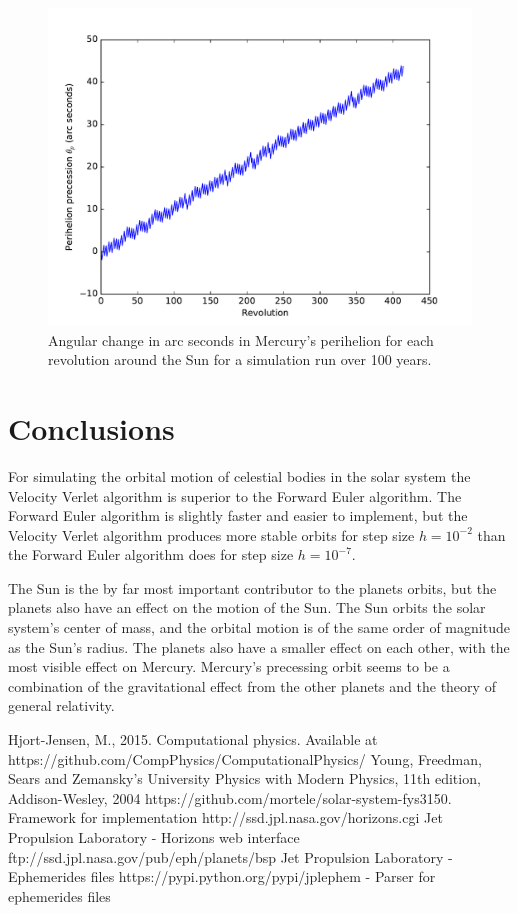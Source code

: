 \documentclass{article}
\begin{document}
\begin{figure}
\centering
\includegraphics[width=0.8\linewidth]{fig/Perihelion_Precession.pdf}
\caption{Angular change in arc seconds in Mercury's perihelion for each revolution around the Sun for a simulation run over 100 years.}
\label{fig:peri}
\end{figure}

\section{Conclusions}
\label{sec:conclusions}
For simulating the orbital motion of celestial bodies in the solar system the Velocity Verlet algorithm is superior to the Forward Euler algorithm. The Forward Euler algorithm is slightly faster and easier to implement, but the Velocity Verlet algorithm produces more stable orbits for step size $h=10^{-2}$ than the Forward Euler algorithm does for step size $h=10^{-7}$.

The Sun is the by far most important contributor to the planets orbits, but the planets also have an effect on the motion of the Sun. The Sun orbits the solar system's center of mass, and the orbital motion is of the same order of magnitude as the Sun's radius. The planets also have a smaller effect on each other, with the most visible effect on Mercury. Mercury's precessing orbit seems to be a combination of the gravitational effect from the other planets and the theory of general relativity.


\clearpage

\begin{thebibliography}{1}
 Hjort-Jensen, M., 2015. Computational physics. Available at https://github.com/CompPhysics/ComputationalPhysics/
 Young, Freedman, Sears and Zemansky's University Physics with Modern Physics, 11th edition, Addison-Wesley, 2004  
 https://github.com/mortele/solar-system-fys3150. Framework for implementation
 http://ssd.jpl.nasa.gov/horizons.cgi Jet Propulsion Laboratory - Horizons web interface
 ftp://ssd.jpl.nasa.gov/pub/eph/planets/bsp Jet Propulsion Laboratory - Ephemerides files
 https://pypi.python.org/pypi/jplephem - Parser for ephemerides files
\end{thebibliography}
\end{document}
